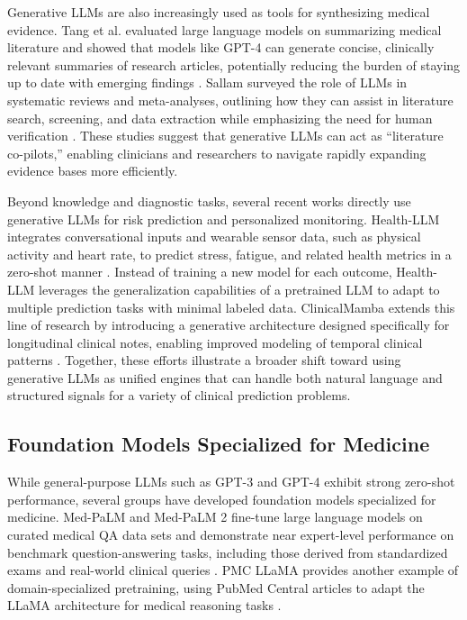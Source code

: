 Generative LLMs are also increasingly used as tools for synthesizing medical evidence. Tang et al. evaluated large language models on summarizing medical literature and showed that models like GPT-4 can generate concise, clinically relevant summaries of research articles, potentially reducing the burden of staying up to date with emerging findings \cite{tang2023evaluating}. Sallam surveyed the role of LLMs in systematic reviews and meta-analyses, outlining how they can assist in literature search, screening, and data extraction while emphasizing the need for human verification \cite{sallam2023chatgpt}. These studies suggest that generative LLMs can act as “literature co-pilots,” enabling clinicians and researchers to navigate rapidly expanding evidence bases more efficiently.

Beyond knowledge and diagnostic tasks, several recent works directly use generative LLMs for risk prediction and personalized monitoring. Health-LLM integrates conversational inputs and wearable sensor data, such as physical activity and heart rate, to predict stress, fatigue, and related health metrics in a zero-shot manner \cite{kim2024health}. Instead of training a new model for each outcome, Health-LLM leverages the generalization capabilities of a pretrained LLM to adapt to multiple prediction tasks with minimal labeled data. ClinicalMamba extends this line of research by introducing a generative architecture designed specifically for longitudinal clinical notes, enabling improved modeling of temporal clinical patterns \cite{yang2024clinicalmamba}. Together, these efforts illustrate a broader shift toward using generative LLMs as unified engines that can handle both natural language and structured signals for a variety of clinical prediction problems.

\subsection{Foundation Models Specialized for Medicine}

While general-purpose LLMs such as GPT-3 and GPT-4 exhibit strong zero-shot performance, several groups have developed foundation models specialized for medicine. Med-PaLM and Med-PaLM 2 fine-tune large language models on curated medical QA data sets and demonstrate near expert-level performance on benchmark question-answering tasks, including those derived from standardized exams and real-world clinical queries \cite{singhal2025toward}. PMC LLaMA provides another example of domain-specialized pretraining, using PubMed Central articles to adapt the LLaMA architecture for medical reasoning tasks \cite{wu2024pmcllama}.

